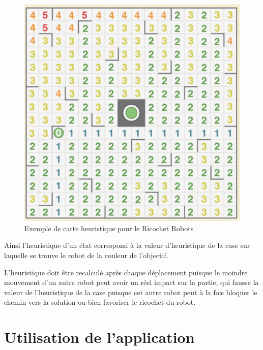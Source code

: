\documentclass[a4paper, 12pt]{article}
\begin{document}
         \begin{figure}[H]
            \centering
            \includegraphics[scale=0.6]{images/mapHeuristique.PNG}
            \caption{Exemple de carte heuristique pour le Ricochet Robots\cite{heurist}}
        \end{figure}
        
        Ainsi l'heuristique d'un état correspond à la valeur d'heuristique de la case sur laquelle se trouve le robot de la couleur de l'objectif.
        
        L'heuristique doit être recalculé après chaque déplacement puisque le moindre mouvement d'un autre robot peut avoir un réel impact sur la partie, qui fausse la valeur de l'heuristique de la case puisque cet autre robot peut à la fois bloquer le chemin vers la solution ou bien favoriser le ricochet du robot.
        
\newpage %

\section{Utilisation de l'application}
\end{document}
